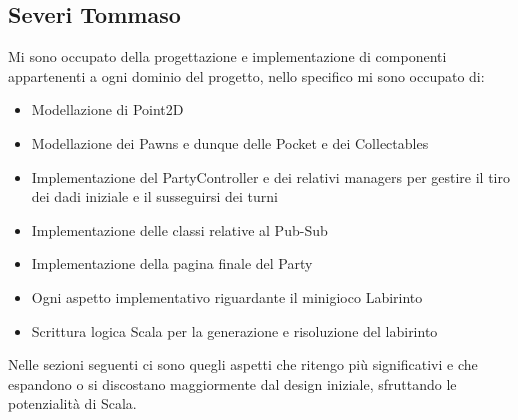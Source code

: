 \subsection{Severi Tommaso} \label{sec:implementation-severi}
Mi sono occupato della progettazione e implementazione di componenti appartenenti a ogni
dominio del progetto, nello specifico mi sono occupato di:
\begin{itemize}
    \item Modellazione di Point2D
    \item Modellazione dei Pawns e dunque delle Pocket e dei Collectables
    \item Implementazione del PartyController e dei relativi managers per gestire il tiro dei dadi
          iniziale e il susseguirsi dei turni
    \item Implementazione delle classi relative al Pub-Sub
    \item Implementazione della pagina finale del Party
    \item Ogni aspetto implementativo riguardante il minigioco Labirinto
    \item Scrittura logica Scala per la generazione e risoluzione del labirinto
\end{itemize}

Nelle sezioni seguenti ci sono quegli aspetti che ritengo più significativi e che espandono o si
discostano maggiormente dal design iniziale, sfruttando le potenzialità di Scala.

